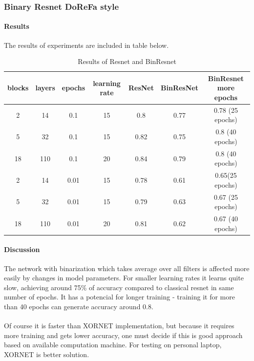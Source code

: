 \documentclass[licencjacka]{pracamgr}
\begin{document}
		\subsubsection{Binary Resnet DoReFa style}
		        \paragraph{Results} 
		        The results of experiments are included in table below.
		        \begin{table}[H]
		                        \caption{Results of Resnet and BinResnet}
		                        \centering
		                        \begin{tabular}{c c c c c c c}
		                        \hline\hline
		                        blocks & layers & epochs & learning rate & ResNet & BinResNet & BinResnet more epochs  \\ [0.5ex]
		                        \hline
		                                2 & 14  & 0.1   & 15 & 0.8 & 0.77 & 0.78 (25 epochs) \\
		                                5 & 32  & 0.1   & 15 & 0.82 & 0.75 & 0.8 (40 epochs) \\
		                                18      & 110 & 0.1     & 20 & 0.84 & 0.79 & 0.8 (40 epochs)\\
		                        \hline
		                                2 & 14  & 0.01  & 15 & 0.78 & 0.61 & 0.65(25 epochs) \\
		                                5 & 32  & 0.01  & 15 & 0.79 & 0.63 & 0.67 (25 epochs) \\
		                                18 & 110 & 0.01 & 20 & 0.81 & 0.62 & 0.67 (40 epochs) \\
		                        \hline
		                        \end{tabular}
		                        \label{table:nonlin}
		        \end{table}

		        \paragraph{Discussion} 
		                The network with binarization which takes average over all filters is affected more easily by changes in model parameters. For smaller learning rates it learns quite slow, achieving around 75\% of accuracy compared to classical resnet in same number of epochs. It has a potencial for longer training - training it for more than 40 epochs can generate accuracy around 0.8. 
		                \\\\
		                Of course it is faster than XORNET implementation, but because it requires more training and gets lower accuracy, one must decide if this is good approach based on available computation machine. For testing on personal laptop, XORNET is better solution.
\end{document}
